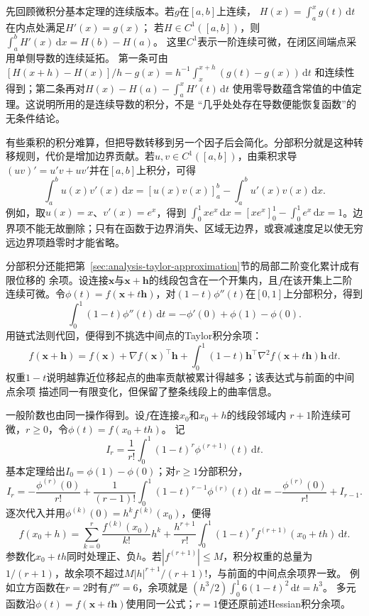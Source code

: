 先回顾微积分基本定理的连续版本。若$g$在$[a,b]$上连续，
$H(x)=\int_a^xg(t)\,\mathrm dt$在内点处满足$H'(x)=g(x)$；
若$H\in C^1([a,b])$，则$\int_a^bH'(x)\,\mathrm dx=H(b)-H(a)$。
这里$C^1$表示一阶连续可微，在闭区间端点采用单侧导数的连续延拓。
第一条可由
$[H(x+h)-H(x)]/h-g(x)=h^{-1}\int_x^{x+h}(g(t)-g(x))\,\mathrm dt$
和连续性得到；第二条再对$H(x)-H(a)-\int_a^xH'(t)\,\mathrm dt$
使用零导数蕴含常值的中值定理。这说明所用的是连续导数的积分，不是
“几乎处处存在导数便能恢复函数”的无条件结论。

有些乘积的积分难算，但把导数转移到另一个因子后会简化。分部积分就是这种转移规则，代价是增加边界贡献。若$u,v\in C^1([a,b])$，由乘积求导$(uv)'=u'v+uv'$并在$[a,b]$上积分，可得
\begin{equation}
  \int_a^b u(x)v'(x)\,\mathrm{d}x
  =
  [u(x)v(x)]_a^b
  -
  \int_a^b u'(x)v(x)\,\mathrm{d}x.
\label{eq:analysis-integration-by-parts}
\end{equation}
例如，取$u(x)=x$、$v'(x)=e^x$，得到 $\int_0^1xe^x\,\mathrm{d}x=[xe^x]_0^1-\int_0^1e^x\,\mathrm{d}x=1$。边界项不能无故删除；只有在函数于边界消失、区域无边界，或衰减速度足以使无穷远边界项趋零时才能省略。

分部积分还能把第~\ref{sec:analysis-taylor-approximation}节的局部二阶变化累计成有限位移的
余项。设连接$\bm{x}$与$\bm{x}+\bm{h}$的线段包含在一个开集内，且$f$在该开集上二阶
连续可微。令$\phi(t)=f(\bm{x}+t\bm{h})$，对$(1-t)\phi''(t)$在$[0,1]$上分部积分，得到
\[
  \int_0^1(1-t)\phi''(t)\,\mathrm{d}t
  =-\phi'(0)+\phi(1)-\phi(0).
\]
用链式法则代回，便得到不挑选中间点的Taylor积分余项：
\[   f(\bm{x}+\bm{h})   =   f(\bm{x})   +\nabla f(\bm{x})^{\top}\bm{h}   +   \int_0^1(1-t)   \bm{h}^{\top}\nabla^2f(\bm{x}+t\bm{h})\bm{h}\,\mathrm{d}t. \]
权重$1-t$说明越靠近位移起点的曲率贡献被累计得越多；该表达式与前面的中间点余项
描述同一有限变化，但保留了整条线段上的曲率信息。

一般阶数也由同一操作得到。设$f$在连接$x_0$和$x_0+h$的线段邻域内
$r+1$阶连续可微，$r\geq0$，令$\phi(t)=f(x_0+th)$。
记
\[
 I_r=\frac1{r!}\int_0^1(1-t)^r\phi^{(r+1)}(t)\,\mathrm dt.
\]
基本定理给出$I_0=\phi(1)-\phi(0)$；对$r\geq1$分部积分，
\[
 I_r=-\frac{\phi^{(r)}(0)}{r!}
       +\frac1{(r-1)!}\int_0^1(1-t)^{r-1}\phi^{(r)}(t)\,\mathrm dt
     =-\frac{\phi^{(r)}(0)}{r!}+I_{r-1}.
\]
逐次代入并用$\phi^{(k)}(0)=h^k f^{(k)}(x_0)$，便得
\begin{equation}
 f(x_0+h)=\sum_{k=0}^r\frac{f^{(k)}(x_0)}{k!}h^k
 +\frac{h^{r+1}}{r!}
   \int_0^1(1-t)^r f^{(r+1)}(x_0+th)\,\mathrm dt.
\label{eq:analysis-taylor-integral-remainder}
\end{equation}
参数化$x_0+th$同时处理正、负$h$。若$|f^{(r+1)}|\leq M$，积分权重的总量为
$1/(r+1)$，故余项不超过$M|h|^{r+1}/(r+1)!$，与前面的中间点余项界一致。
例如立方函数在$r=2$时有$f'''=6$，余项就是
$(h^3/2)\int_0^1 6(1-t)^2\,\mathrm dt=h^3$。
多元函数沿$\phi(t)=f(\bm x+t\bm h)$使用同一公式；$r=1$便还原前述Hessian积分余项。


